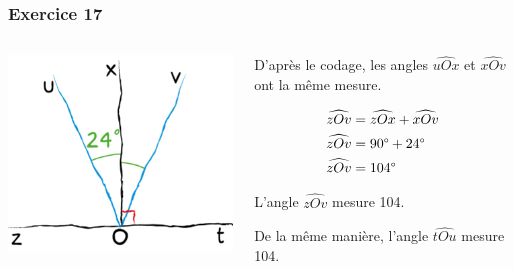 \documentclass[xcolor={dvipsnames}]{beamer}
\begin{document}
\begin{frame}
	\frametitle{Exercice 17}
	
	\begin{columns}
		\begin{column}{0.4\textwidth}
			\begin{center}
				\includegraphics[scale=0.5]{17}\pause
			\end{center}
		\end{column}
		\begin{column}{0.6\textwidth}
			D'après le codage, les angles $\widehat{uOx}$ et $\widehat{xOv}$ ont la même mesure. \pause
			
			\begin{align*}
				\widehat{zOv} &= \widehat{zOx} + \widehat{xOv} \\
				\widehat{zOv} &= 90\degree + 24\degree \\
				\widehat{zOv} &= 104\degree
			\end{align*}
			
			L'angle $\widehat{zOv}$ mesure 104\degree.\pause
			
			De la même manière, l'angle $\widehat{tOu}$ mesure 104\degree.
		\end{column}
	\end{columns}
	
	
	
\end{frame}
\end{document}
